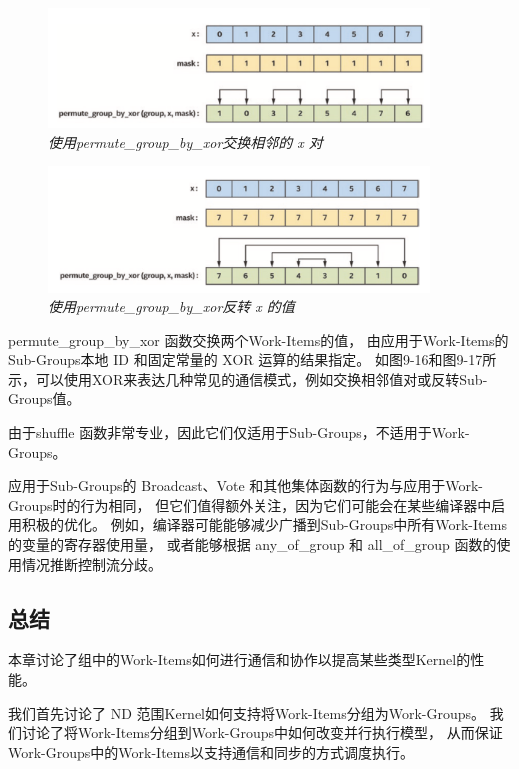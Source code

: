 \begin{figure}[H]
	\centering
	\includegraphics[width=0.9\textwidth]{figs/F9.16.png}
	\caption{\textit{使用permute\_group\_by\_xor交换相邻的 x 对 }}
\end{figure}

\begin{figure}[H]
	\centering
	\includegraphics[width=0.9\textwidth]{figs/F9.17.png}
	\caption{\textit{使用permute\_group\_by\_xor反转 x 的值 }}
\end{figure}

permute\_group\_by\_xor 函数交换两个Work-Items的值，
由应用于Work-Items的Sub-Groups本地 ID 和固定常量的 XOR 运算的结果指定。 
如图9-16和图9-17所示，可以使用XOR来表达几种常见的通信模式，例如交换相邻值对或反转Sub-Groups值。

由于shuffle 函数非常专业，因此它们仅适用于Sub-Groups，不适用于Work-Groups。

\begin{remark}
应用于Sub-Groups的 Broadcast、Vote 和其他集体函数的行为与应用于Work-Groups时的行为相同，
但它们值得额外关注，因为它们可能会在某些编译器中启用积极的优化。
例如，编译器可能能够减少广播到Sub-Groups中所有Work-Items的变量的寄存器使用量，
或者能够根据 any\_of\_group 和 all\_of\_group 函数的使用情况推断控制流分歧。
\end{remark}

\subsection{总结}
本章讨论了组中的Work-Items如何进行通信和协作以提高某些类型Kernel的性能。

我们首先讨论了 ND 范围Kernel如何支持将Work-Items分组为Work-Groups。 
我们讨论了将Work-Items分组到Work-Groups中如何改变并行执行模型，
从而保证Work-Groups中的Work-Items以支持通信和同步的方式调度执行。

